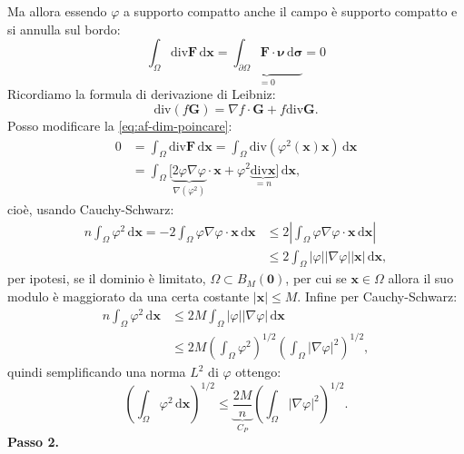 \documentclass[10pt,a4paper,twoside,openright]{book}
\newcommand{\x}{\mathbf{x}}
\newcommand{\zer}{\mathbf{0}}
\newcommand{\sigg}{\bm{\sigma}}
\newcommand{\de}{\,\mathrm d}
\newcommand{\dxx}{\de \x}
\newcommand{\dsig}{\de \sigg}
\begin{document}
\begin{dimostrazione}
    Ma allora essendo $\varphi $ a supporto compatto anche il campo è supporto compatto e si annulla sul bordo:
    \begin{equation}
        \int _{\Omega }\mathrm{div}\mathbf{F} \dxx =\underbrace{\int _{\partial \Omega }\mathbf{F} \cdotp \bm{\nu }\dsig }_{=0} =0
        \label{eq:af-dim-poincare}
    \end{equation}
    Ricordiamo la formula di derivazione di Leibniz:
    \begin{equation*}
        \mathrm{div}(f\mathbf{G}) =\nabla f\cdotp \mathbf{G} +f\mathrm{div}\mathbf{G} .
    \end{equation*}
    Posso modificare la \eqref{eq:af-dim-poincare}:
    \begin{align*}
        0 & =\int _{\Omega }\mathrm{div}\mathbf{F} \dxx =\int _{\Omega }\mathrm{div}\left(\varphi ^{2}(\x)\x\right) \dxx                                                      \\
          & =\int _{\Omega }\big[\underbrace{2\varphi \nabla \varphi }_{\nabla \left(\varphi ^{2}\right)} \cdotp \x +\varphi ^{2}\underbrace{\mathrm{div}\x}_{=n}\big] \dxx ,
    \end{align*}
    cioè, usando Cauchy-Schwarz:
    \begin{align*}
        n\int _{\Omega } \varphi ^{2} \dxx =-2\int _{\Omega } \varphi \nabla \varphi \cdotp \x \dxx & \leqslant 2\left| \int _{\Omega } \varphi \nabla \varphi \cdotp \x \dxx\right| \\
                                                                                                    & \leqslant 2\int _{\Omega }| \varphi | | \nabla \varphi | | \x| \dxx ,
    \end{align*}
    per ipotesi, se il dominio è limitato, $\displaystyle \Omega \subset B_{M}(\zer)$, per cui se $\displaystyle \x \in \Omega $ allora il suo modulo è maggiorato da una certa costante $\displaystyle | \x| \leqslant M$. Infine per Cauchy-Schwarz:
    \begin{align*}
        n\int _{\Omega } \varphi ^{2} \dxx & \leqslant 2M\int _{\Omega }| \varphi | | \nabla \varphi | \dxx                                                         \\
                                           & \leqslant 2M\left(\int _{\Omega } \varphi ^{2}\right)^{1/2}\left(\int _{\Omega }| \nabla \varphi | ^{2}\right)^{1/2} ,
    \end{align*}
    quindi semplificando una norma $\displaystyle L^{2}$ di $\displaystyle \varphi $ ottengo:
    \begin{equation*}
        \left(\int _{\Omega } \varphi ^{2} \dxx\right)^{1/2} \leqslant \underbrace{\frac{2M}{n}}_{C_{P}}\left(\int _{\Omega }| \nabla \varphi | ^{2}\right)^{1/2} .
    \end{equation*}
    \textbf{Passo 2.}


\end{dimostrazione}
\end{document}
